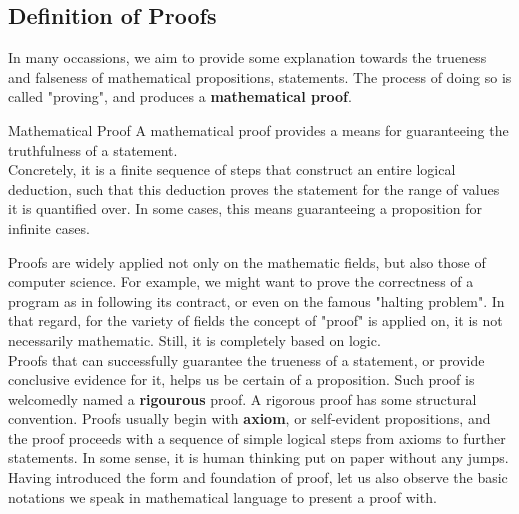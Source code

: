 \subsection{Definition of Proofs}
In many occassions, we aim to provide some explanation towards the trueness and falseness of mathematical propositions, statements. The process of doing so is called "proving", and produces a \textbf{mathematical proof}.
\begin{ln-define}{Mathematical Proof}{}
    A mathematical proof provides a means for guaranteeing the truthfulness of a statement. \\
    Concretely, it is a finite sequence of steps that construct an entire logical deduction, such that this deduction proves the statement for the range of values it is quantified over. In some cases, this means guaranteeing a proposition for infinite cases.
\end{ln-define}
Proofs are widely applied not only on the mathematic fields, but also those of computer science. For example, we might want to prove the correctness of a program as in following its contract, or even on the famous "halting problem". In that regard, for the variety of fields the concept of "proof" is applied on, it is not necessarily mathematic. Still, it is completely based on logic. \\
Proofs that can successfully guarantee the trueness of a statement, or provide conclusive evidence for it, helps us be certain of a proposition. Such proof is welcomedly named a \textbf{rigourous} proof. 
A rigorous proof has some structural convention. Proofs usually begin with \textbf{axiom}, or self-evident propositions, and the proof proceeds with a sequence of simple logical steps from axioms to further statements. In some sense, it is human thinking put on paper without any jumps. \\
Having introduced the form and foundation of proof, let us also observe the basic notations we speak in mathematical language to present a proof with.

